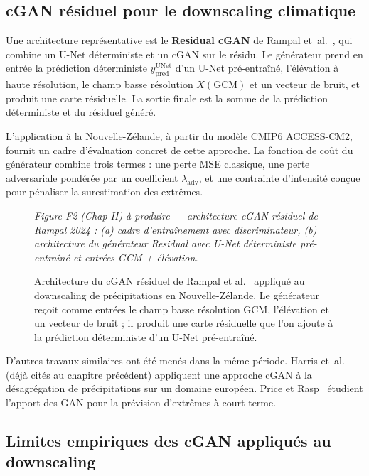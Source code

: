 \documentclass[14pt,a4paper,openany]{extreport}
\theoremstyle{definition}
\newcommand{\figplaceholder}[2][0.9\linewidth]{%
  \begin{tcolorbox}[width=#1,height=5cm,valign=center,colback=gray!8,colframe=gray!45,arc=2pt,boxrule=0.5pt]
    \centering\small\textit{#2}
  \end{tcolorbox}%
}
\begin{document}
\subsection{cGAN résiduel pour le downscaling climatique}
\label{ssec:soa-rampal}

Une architecture représentative est le \textbf{Residual cGAN} de Rampal et~al.~\cite{rampal_cgan_2024}, qui combine un U-Net déterministe et un cGAN sur le résidu. Le générateur prend en entrée la prédiction déterministe $y^{\mathrm{UNet}}_{\mathrm{pred}}$ d'un U-Net pré-entraîné, l'élévation à haute résolution, le champ basse résolution $X(\mathrm{GCM})$ et un vecteur de bruit, et produit une carte résiduelle. La sortie finale est la somme de la prédiction déterministe et du résiduel généré.

L'application à la Nouvelle-Zélande, à partir du modèle CMIP6 ACCESS-CM2, fournit un cadre d'évaluation concret de cette approche. La fonction de coût du générateur combine trois termes : une perte MSE classique, une perte adversariale pondérée par un coefficient $\lambda_{\mathrm{adv}}$, et une contrainte d'intensité conçue pour pénaliser la surestimation des extrêmes.

\begin{figure}[ht]
  \centering
  \figplaceholder{Figure F2 (Chap II) à produire --- architecture cGAN résiduel de Rampal 2024 : (a) cadre d'entraînement avec discriminateur, (b) architecture du générateur Residual avec U-Net déterministe pré-entraîné et entrées GCM + élévation.}
  \caption{Architecture du cGAN résiduel de Rampal et al.~\cite{rampal_cgan_2024} appliqué au downscaling de précipitations en Nouvelle-Zélande. Le générateur reçoit comme entrées le champ basse résolution GCM, l'élévation et un vecteur de bruit ; il produit une carte résiduelle que l'on ajoute à la prédiction déterministe d'un U-Net pré-entraîné.}
  \label{fig:cgan-rampal}
\end{figure}

D'autres travaux similaires ont été menés dans la même période. Harris et~al.~\cite{harris_2022} (déjà cités au chapitre précédent) appliquent une approche cGAN à la désagrégation de précipitations sur un domaine européen. Price et Rasp~\cite{price_rasp_2022} étudient l'apport des GAN pour la prévision d'extrêmes à court terme.

\subsection{Limites empiriques des cGAN appliqués au downscaling}
\label{ssec:soa-cgan-limites}
\end{document}
